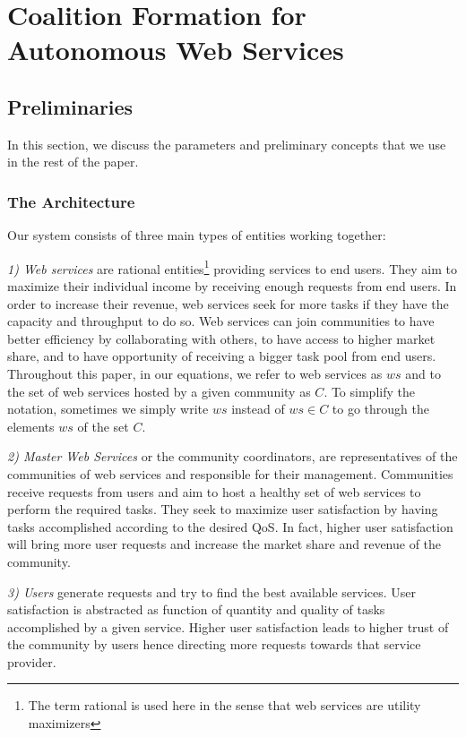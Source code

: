 \setcounter{chapter}{2}

\chapter{Coalition Formation for Autonomous Web Services}

\section{Preliminaries}\label{s:preliminaries}

In this section, we discuss the parameters and preliminary
concepts that we use in the rest of the paper.

\subsection{The Architecture}

Our system consists of three main types of entities working
together:

\emph{1) Web services} are rational entities\footnote{The term
rational is used here in the sense that web services are utility
maximizers} providing services to end users. They aim to maximize
their individual income by receiving enough requests from end
users. In order to increase their revenue, web services seek for
more tasks if they have the capacity and throughput to do so. Web
services can join communities to have better efficiency by
collaborating with others, to have access to higher market share,
and to have opportunity of receiving a bigger task pool from end
users. Throughout this paper, in
our equations, we refer to web services as $ws$ and to the set of
web services hosted by a given community as $C$. To simplify the
notation, sometimes we simply write $ws$ instead of $ws \in C$ to
go through the elements $ws$ of the set $C$.

\emph{2) Master Web Services} or the community coordinators, are representatives of the
communities of web services and responsible for their management.
Communities receive requests from users and aim to host a healthy
set of web services to perform the required tasks. They seek to
maximize user satisfaction by having tasks accomplished according
to the desired QoS. In fact, higher user satisfaction will bring
more user requests and increase the market share and revenue of
the community.

\emph{3) Users} generate requests and try to find the best
available services. User satisfaction is abstracted as function of
quantity and quality of tasks accomplished by a given service.
Higher user satisfaction leads to higher trust of the community by users hence directing more requests towards that service provider.

